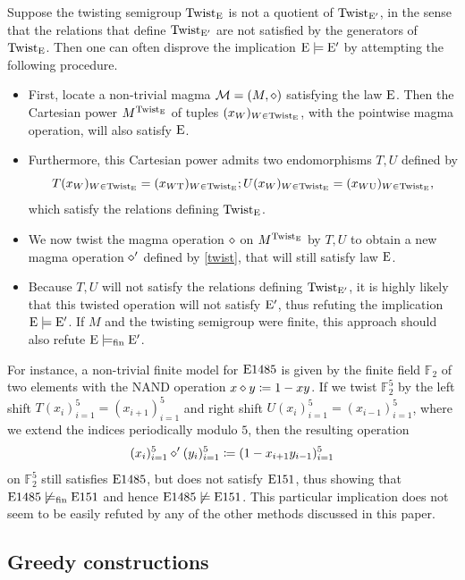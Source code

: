 Suppose the twisting semigroup $\operatorname{Twist}_{\mathrm{E}}$ is not a quotient of $\operatorname{Twist}_{{\mathrm{E}'}}$, in the sense that the relations that define $\operatorname{Twist}_{{\mathrm{E}'}}$ are not satisfied by the generators of $\operatorname{Twist}_{\mathrm{E}}$.  Then one can often disprove the implication $\mathrm{E} \models {\mathrm{E}'}$ by attempting the following procedure.
\begin{itemize}
\item First, locate a non-trivial magma ${\mathcal{M}} = (M,\diamond)$ satisfying the law $\mathrm{E}$.  Then the Cartesian power $M^{\operatorname{Twist}_{\mathrm{E}}}$ of tuples $(x_W)_{W \in \operatorname{Twist}_{\mathrm{E}}}$, with the pointwise magma operation, will also satisfy $\mathrm{E}$.
\item Furthermore, this Cartesian power admits two endomorphisms $T, U$ defined by
$$ T (x_W)_{W \in \operatorname{Twist}_{\mathrm{E}}} = (x_{W \mathrm{T}})_{W \in \operatorname{Twist}_{\mathrm{E}}};
U (x_W)_{W \in \operatorname{Twist}_{\mathrm{E}}} = (x_{W \mathrm{U}})_{W \in \operatorname{Twist}_{\mathrm{E}}},$$
which satisfy the relations defining $\operatorname{Twist}_{\mathrm{E}}$.
\item We now twist the magma operation $\diamond$ on $M^{\operatorname{Twist}_{\mathrm{E}}}$ by $T,U$ to obtain a new magma operation $\diamond'$ defined by \eqref{twist}, that will still satisfy law $\mathrm{E}$.
\item Because $T, U$ will not satisfy the relations defining $\operatorname{Twist}_{{\mathrm{E}'}}$, it is highly likely that this twisted operation will not satisfy ${\mathrm{E}'}$, thus refuting the implication $\mathrm{E} \models {\mathrm{E}'}$.  If $M$ and the twisting semigroup were finite, this approach should also refute $\mathrm{E} \models_{\mathrm{fin}} {\mathrm{E}'}$.
\end{itemize}

For instance, a non-trivial finite model for $\mathrm{E}1485$ is given by the finite field $\mathbb{F}_2$ of two elements with the NAND operation $x \diamond y \coloneqq 1-xy$.  If we twist $\mathbb{F}_2^5$ by the left shift $T(x_i)_{i=1}^5 = (x_{i+1})_{i=1}^5$ and right shift $U(x_i)_{i=1}^5 = (x_{i-1})_{i=1}^5$, where we extend the indices periodically modulo $5$, then the resulting operation
$$ (x_i)_{i=1}^5 \diamond' (y_i)_{i=1}^5 \coloneqq (1 - x_{i+1} y_{i-1})_{i=1}^5$$
on $\mathbb{F}_2^5$ still satisfies $\mathrm{E}1485$, but does not satisfy $\mathrm{E}151$, thus showing that $\mathrm{E}1485 \not\models_{\mathrm{fin}} \mathrm{E}151$ and hence $\mathrm{E}1485 \not\models \mathrm{E}151$.  This particular implication does not seem to be easily refuted by any of the other methods discussed in this paper.

\subsection{Greedy constructions}\label{greedy-sec}

